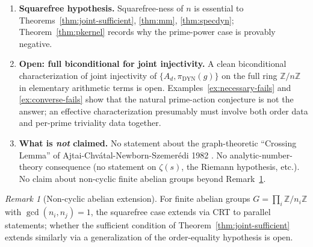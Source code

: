 \documentclass[11pt,reqno]{amsart}
\theoremstyle{plain}
\theoremstyle{definition}
\theoremstyle{remark}
\newtheorem{remark}[theorem]{Remark}
\DeclareMathOperator{\dyn}{DYN}
\newcommand{\Z}{\mathbb{Z}}
\begin{document}
\begin{enumerate}[label={\upshape(\arabic*)}]
\item \textbf{Squarefree hypothesis.} Squarefree-ness of $n$ is
essential to Theorems~\ref{thm:joint-sufficient},
\ref{thm:mm}, \ref{thm:specdyn};
Theorem~\ref{thm:pkernel} records why the prime-power case is
provably negative.

\item \textbf{Open: full biconditional for joint injectivity.} A
clean biconditional characterization of joint injectivity of
$\{A_{d}, \pi_{\dyn}(g)\}$ on the full ring $\Z/n\Z$ in elementary
arithmetic terms is open. Examples~\ref{ex:necessary-fails} and
\ref{ex:converse-fails} show that the natural prime-action
conjecture is not the answer; an effective characterization
presumably must involve both order data and per-prime triviality
data together.

\item \textbf{What is \emph{not} claimed.} No statement about the
graph-theoretic ``Crossing Lemma'' of
Ajtai-Chv\'atal-Newborn-Szemer\'edi 1982 \cite{ACNS1982}. No
analytic-number-theory consequence (no statement on $\zeta(s)$, the
Riemann hypothesis, etc.). No claim about non-cyclic finite abelian
groups beyond Remark~\ref{rem:abelian-extension}.
\end{enumerate}

\begin{remark}[Non-cyclic abelian extension]\label{rem:abelian-extension}
For finite abelian groups $G = \prod_{i} \Z/n_{i}\Z$ with
$\gcd(n_{i}, n_{j}) = 1$, the squarefree case extends via CRT to
parallel statements; whether the sufficient condition of
Theorem~\ref{thm:joint-sufficient} extends similarly via a
generalization of the order-equality hypothesis is open.
\end{remark}
\end{document}
